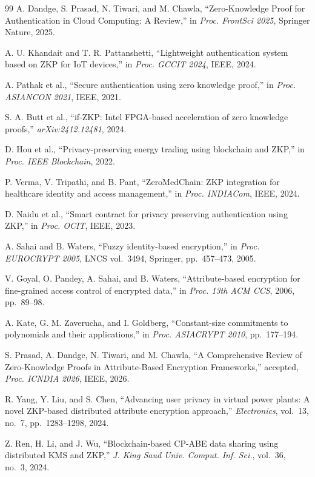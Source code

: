 \documentclass[12pt,a4paper,oneside]{report}
\begin{document}
\begin{thebibliography}{99}
A. Dandge, S. Prasad, N. Tiwari, and M. Chawla, ``Zero-Knowledge Proof for
Authentication in Cloud Computing: A Review,'' in \textit{Proc. FrontSci 2025},
Springer Nature, 2025.

A. U. Khandait and T. R. Pattanshetti, ``Lightweight authentication system based
on ZKP for IoT devices,'' in \textit{Proc. GCCIT 2024}, IEEE, 2024.

A. Pathak et al., ``Secure authentication using zero knowledge proof,''
in \textit{Proc. ASIANCON 2021}, IEEE, 2021.

S. A. Butt et al., ``if-ZKP: Intel FPGA-based acceleration of zero knowledge
proofs,'' \textit{arXiv:2412.12481}, 2024.

D. Hou et al., ``Privacy-preserving energy trading using blockchain and ZKP,''
in \textit{Proc. IEEE Blockchain}, 2022.

P. Verma, V. Tripathi, and B. Pant, ``ZeroMedChain: ZKP integration for healthcare
identity and access management,'' in \textit{Proc. INDIACom}, IEEE, 2024.

D. Naidu et al., ``Smart contract for privacy preserving authentication using ZKP,''
in \textit{Proc. OCIT}, IEEE, 2023.

A. Sahai and B. Waters, ``Fuzzy identity-based encryption,'' in
\textit{Proc. EUROCRYPT 2005}, LNCS vol.~3494, Springer, pp.~457--473, 2005.

V. Goyal, O. Pandey, A. Sahai, and B. Waters, ``Attribute-based encryption for
fine-grained access control of encrypted data,'' in \textit{Proc. 13th ACM CCS},
2006, pp.~89--98.

A. Kate, G. M. Zaverucha, and I. Goldberg, ``Constant-size commitments to
polynomials and their applications,'' in \textit{Proc. ASIACRYPT 2010},
pp.~177--194.

S. Prasad, A. Dandge, N. Tiwari, and M. Chawla, ``A Comprehensive Review of
Zero-Knowledge Proofs in Attribute-Based Encryption Frameworks,'' accepted,
\textit{Proc. ICNDIA 2026}, IEEE, 2026.

R. Yang, Y. Liu, and S. Chen, ``Advancing user privacy in virtual power plants:
A novel ZKP-based distributed attribute encryption approach,''
\textit{Electronics}, vol.~13, no.~7, pp.~1283--1298, 2024.

Z. Ren, H. Li, and J. Wu, ``Blockchain-based CP-ABE data sharing using distributed
KMS and ZKP,'' \textit{J. King Saud Univ. Comput. Inf. Sci.}, vol.~36, no.~3, 2024.


\end{thebibliography}
\end{document}
